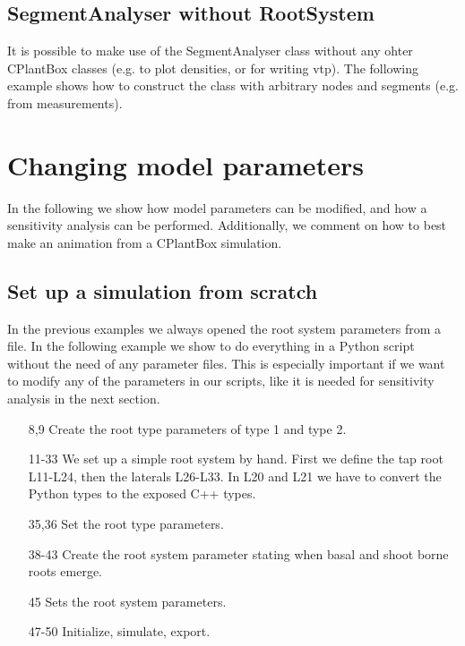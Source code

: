 \documentclass[a4paper]{article}
\begin{document}
\subsection{SegmentAnalyser without RootSystem}

It is possible to make use of the SegmentAnalyser class without any ohter CPlantBox classes (e.g. to plot densities, or for writing vtp). The following example shows how to construct the class with arbitrary nodes and segments (e.g. from measurements). 






\section{Changing model parameters}

In the following we show how model parameters can be modified, and how a sensitivity analysis can be performed. Additionally, we comment on how to best make an animation from a CPlantBox simulation.

\subsection{Set up a simulation from scratch} \label{sec:from_scratch}

In the previous examples we always opened the root system parameters from a file. 
In the following example we show to do everything in a Python script without the need of any parameter files. 
This is especially important if we want to modify any of the parameters in our scripts, like it is needed for sensitivity analysis in the next section. 



\begin{itemize}

\item[8,9] Create the root type parameters of type 1 and type 2.
\item[11-33] We set up a simple root system by hand. First we define the tap root L11-L24, then the laterals L26-L33. In L20 and L21 we have to convert the Python types to the exposed C++ types.
\item[35,36] Set the root type parameters.

\item[38-43] Create the root system parameter stating when basal and shoot borne roots emerge.

\item[45] Sets the root system parameters.

\item[47-50] Initialize, simulate, export. 

\end{itemize}
\end{document}
